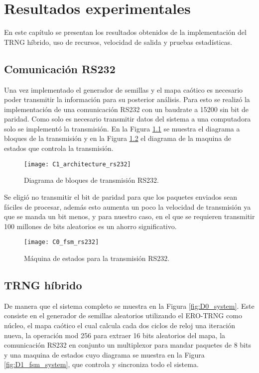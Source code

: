 \chapter{Resultados experimentales}

    En este capítulo se presentan los resultados obtenidos de la implementación del TRNG híbrido, uso de recursos, velocidad de salida y pruebas estadísticas.

    \section{Comunicación RS232}

    Una vez implementado el generador de semillas y el mapa caótico es necesario poder transmitir la información para su posterior análisis. Para esto se realizó la implementación de una comunicación RS232 con un baudrate a 15200 sin bit de paridad. Como solo es necesario transmitir datos del sistema a una computadora  solo se implementó la transmisión. En la Figura \ref{fig:C1_architecture_rs232} se muestra el diagrama a bloques de la transmisión y en la Figura \ref{fig:C0_fsm_rs232} el diagrama de la maquina de estados que controla la transmisión.

        \begin{figure}[hbtp]
            \caption{Diagrama de bloques de transmisión RS232.}
            \centering
            \texttt{[image: C1\_architecture\_rs232]}
            \label{fig:C1_architecture_rs232}
        \end{figure}

        Se eligió no transmitir el bit de paridad para que los paquetes enviados sean fáciles de procesar, además esto aumenta un poco la velocidad de transmisión ya que se manda un bit menos, y para nuestro caso, en el que se requieren transmitir 100 millones de bits aleatorios es un ahorro significativo. 

        \begin{figure}[hbtp]
            \caption{Máquina de estados para la transmisión RS232.}
            \centering
            \texttt{[image: C0\_fsm\_rs232]}
            \label{fig:C0_fsm_rs232}
        \end{figure}	

    \section{TRNG híbrido}

        De manera que el sistema completo se muestra en la Figura \ref{fig:D0_system}. Este consiste en el generador de semillas aleatorios utilizando el ERO-TRNG como núcleo, el mapa caótico el cual calcula cada dos ciclos de reloj una iteración nueva, la operación mod 256 para extraer 16 bits aleatorios del mapa, la comunicación RS232 en conjunto un multiplexor para mandar paquetes de 8 bits y una maquina de estados cuyo diagrama se muestra en la Figura \ref{fig:D1_fsm_system}, que controla y sincroniza todo el sistema.

